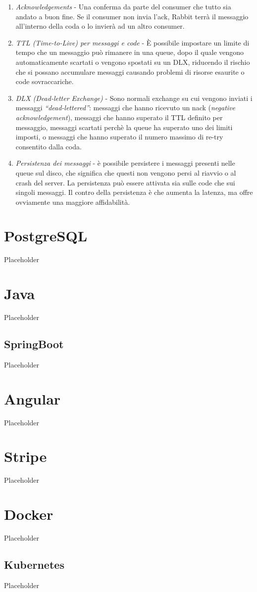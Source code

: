 \begin{itemize}
{      \begin{enumerate}
        \item
          \textit{Acknowledgements} -  Una conferma da parte del consumer che tutto sia andato a buon fine.
          Se il consumer non invia l'ack, Rabbit terr\`a il messaggio all'interno della coda o lo invier\`a ad un altro consumer.
        \item \textit{TTL (Time-to-Live) per messaggi e code} - \`E possibile impostare un limite di tempo che un messaggio pu\`o rimanere
          in una queue, dopo il quale vengono automaticamente scartati o vengono spostati su un DLX, riducendo il rischio che si
          possano accumulare messaggi causando problemi di risorse esaurite o code sovraccariche.
        \item \textit{DLX (Dead-letter Exchange)} - Sono normali exchange su cui vengono inviati i messaggi \textit{``dead-lettered''}: messaggi che hanno
          ricevuto un nack (\textit{negative acknowledgement}), messaggi che hanno superato il TTL definito per messaggio, messaggi
          scartati perch\`e la queue ha superato uno dei limiti imposti, o messaggi che hanno superato il numero massimo di re-try consentito dalla coda.
        \item \textit{Persistenza dei messaggi} -  \`e possibile persistere i messaggi presenti nelle queue sul disco,
          che significa che questi non vengono persi al riavvio o al crash del server. La persistenza pu\`o essere attivata sia sulle code che sui singoli messaggi.
          Il contro della persistenza \`e che aumenta la latenza, ma offre ovviamente una maggiore affidabilit\`a.
      \end{enumerate}
    }
\end{itemize}

\section{PostgreSQL}
Placeholder

\section{Java}
Placeholder
\subsection {SpringBoot}
Placeholder
\section{Angular}
Placeholder
\section{Stripe}
Placeholder
\section{Docker}
Placeholder
\subsection{Kubernetes}
Placeholder
